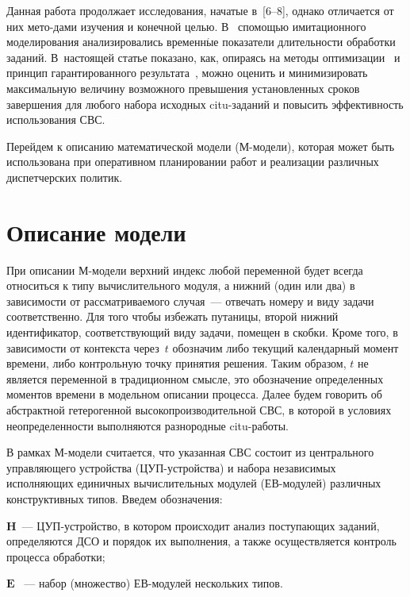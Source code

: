 \begin{multicols}{2}
Данная работа продолжает исследования, начатые в~[6--8], однако
отличается от них мето-\linebreak дами изуче\-ния и конечной целью. 
В~\cite{Gol11, Mal412} с\linebreak по\-мощью имитационного моделирования
анализировались временн$\acute{\mbox{ы}}$е показатели длительности обработки заданий.
В~настоящей статье показано, как, опираясь на  методы оптимизации~\cite{Suh} 
и принцип гарантированного результата~\cite{germ}, можно
оценить и минимизировать максимальную величину возможного превышения
установленных сроков завершения для любого набора исходных
citu-за\-да\-ний и повысить эффективность использования СВС. 

%
Перейдем к
описанию математической модели (М-мо\-де\-ли), которая может быть
использована при оперативном планировании работ и реализации
различных диспетчерских политик.


\section{Описание модели}

При описании М-модели верхний индекс любой переменной будет
всегда относиться к типу вычислительного модуля, а нижний (один или
два) в зависимости от рассматриваемого случая~--- отвечать номеру и
виду задачи соответственно. Для того чтобы избежать путаницы, второй
нижний идентификатор, соответствующий виду задачи,  помещен в
скобки. Кроме того, в зависимости от контекста  через~$t$ обозначим
либо текущий календарный момент времени,  либо контрольную точку
принятия решения. Таким образом,  $t$  не является переменной  в
традиционном смысле, это обозначение определенных моментов времени в
модельном описании процесса. Далее будем говорить об абстрактной
гетерогенной высокопроизводительной  СВС, в которой в условиях
неопределенности выполняются разнородные citu-ра\-боты.

В рамках М-модели считается, что  указанная СВС состоит из
центрального управляющего устройства (ЦУП-устрой\-ст\-ва) и набора
независимых исполняющих единичных вычислительных модулей
(ЕВ-мо\-ду\-лей) различных конструктивных типов. Введем обозначения:

$\textbf{H}$~--- ЦУП-устройство, в котором происходит анализ
поступающих заданий, определяются ДСО и порядок их выполнения, а
также осуществляется контроль процесса обработки;

$\textbf{E}$~ --- набор (множество)  ЕВ-мо\-ду\-лей нескольких типов.


\end{multicols}
